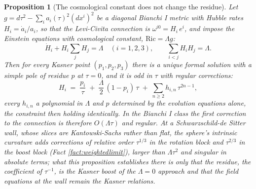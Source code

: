\documentclass[11pt]{article}
\newtheorem{proposition}[theorem]{Proposition}
\theoremstyle{definition}
\begin{document}
\begin{proposition}[The cosmological constant does not change the residue]\label{prop:lambdacorr}
Let $g = d\tau^2 - \sum_i a_i(\tau)^2(dx^i)^2$ be a diagonal Bianchi I metric with Hubble rates $H_i = \dot a_i/a_i$, so that the Levi-Civita connection is $\omega^{i0} = H_i\,e^i$, and impose the Einstein equations with cosmological constant, $\mathrm{Ric} = \Lambda g$:
\[
\dot H_i + H_i\sum_j H_j = \Lambda \quad (i = 1,2,3), \qquad \sum_{i<j}H_iH_j = \Lambda .
\]
Then for every Kasner point $(p_1, p_2, p_3)$ there is a unique formal solution with a simple pole of residue $p$ at $\tau = 0$, and it is odd in $\tau$ with regular corrections:
\[
H_i \;=\; \frac{p_i}{\tau} \;+\; \frac{\Lambda}{2}\,(1 - p_i)\,\tau \;+\; \sum_{n \geq 2} h_{i,n}\,\tau^{2n-1},
\]
every $h_{i,n}$ a polynomial in $\Lambda$ and $p$ determined by the evolution equations alone, the constraint then holding identically. In the Bianchi I class the first correction to the connection is therefore $O(\Lambda\tau)$ and regular. At a Schwarzschild-de Sitter wall, whose slices are Kantowski-Sachs rather than flat, the sphere's intrinsic curvature adds corrections of relative order $\tau^{1/3}$ in the rotation block and $\tau^{2/3}$ in the boost block (Fact \ref{fact:weightedlimit}), larger than $\Lambda\tau^2$ and singular in absolute terms; what this proposition establishes there is only that the residue, the coefficient of $\tau^{-1}$, is the Kasner boost of the $\Lambda = 0$ approach and that the field equations at the wall remain the Kasner relations.
\end{proposition}
\end{document}

